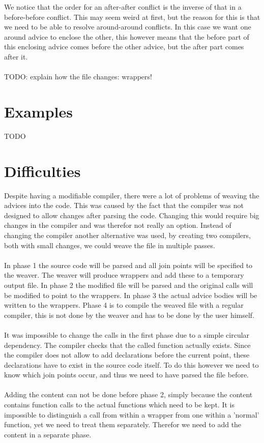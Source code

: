 \documentclass[a4paper]{report}
\begin{document}
We notice that the order for an after-after conflict is the inverse of that in a before-before conflict. This may seem weird at first, but the reason for this is that we need to be able to resolve around-around conflicts. In this case we want one around advice to enclose the other, this however means that the before part of this enclosing advice comes before the other advice, but the after part comes after it.\\
\\
TODO: explain how the file changes: wrappers!
\section{Examples}
TODO

\section{Difficulties}
Despite having a modifiable compiler, there were a lot of problems of weaving the advices into the code. This was caused by the fact that the compiler was not designed to allow changes after parsing the code. Changing this would require big changes in the compiler and was therefor not really an option. Instead of changing the compiler another alternative was used, by creating two compilers, both with small changes, we could weave the file in multiple passes.\\
\\
In phase 1 the source code will be parsed and all join points will be specified to the weaver. The weaver will produce wrappers and add these to a temporary output file. In phase 2 the modified file will be parsed and the original calls will be modified to point to the wrappers. In phase 3 the actual advice bodies will be written to the wrappers. Phase 4 is to compile the weaved file with a regular compiler, this is not done by the weaver and has to be done by the user himself.\\
\\
It was impossible to change the calls in the first phase due to a simple circular dependency. The compiler checks that the called function actually exists. Since the compiler does not allow to add declarations before the current point, these declarations have to exist in the source code itself. To do this however we need to know which join points occur, and thus we need to have parsed the file before.\\
\\
Adding the content can not be done before phase 2, simply because the content contains function calls to the actual functions which need to be kept. It is impossible to distinguish a call from within a wrapper from one within a 'normal' function, yet we need to treat them separately. Therefor we need to add the content in a separate phase.
\end{document}
